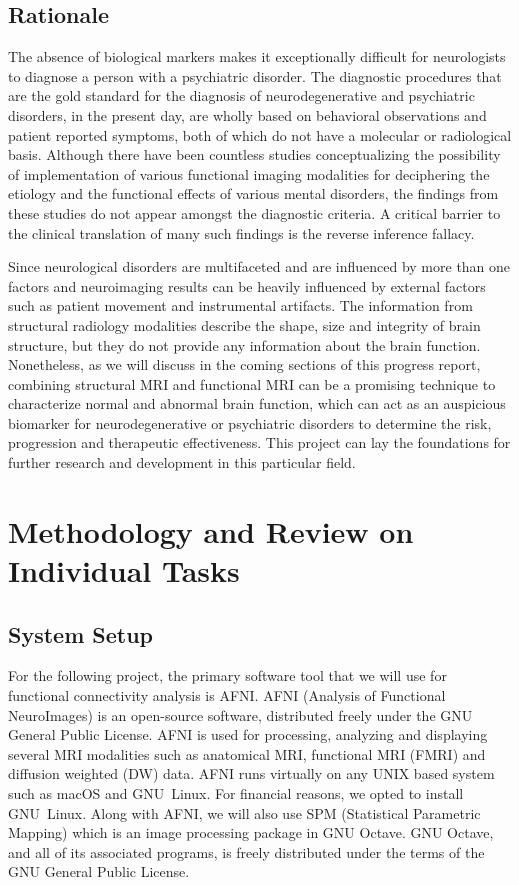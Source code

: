 \documentclass[12pt]{article}
\begin{document}
\subsection{Rationale}

The absence of biological markers makes it exceptionally difficult for
neurologists to diagnose a person with a psychiatric disorder. The
diagnostic procedures that are the gold standard for the diagnosis of
neurodegenerative and psychiatric disorders, in the present day, are
wholly based on behavioral observations and patient reported symptoms,
both of which do not have a molecular or radiological basis. Although
there have been countless studies conceptualizing the possibility of
implementation of various functional imaging modalities for
deciphering the etiology and the functional effects of various mental
disorders, the findings from these studies do not appear amongst the
diagnostic criteria. A critical barrier to the clinical translation of
many such findings is the reverse inference fallacy.

Since neurological disorders are multifaceted and are influenced by
more than one factors and neuroimaging results can be heavily
influenced by external factors such as patient movement and
instrumental artifacts.  The information from structural radiology
modalities describe the shape, size and integrity of brain structure,
but they do not provide any information about the brain function.
Nonetheless, as we will discuss in the coming sections of this
progress report, combining structural MRI and functional MRI can be a
promising technique to characterize normal and abnormal brain
function, which can act as an auspicious biomarker for
neurodegenerative or psychiatric disorders to determine the risk,
progression and therapeutic effectiveness. This project can lay the
foundations for further research and development in this particular
field.

\newpage
\section{Methodology and Review on Individual Tasks}

\subsection{System Setup}%
\label{sub:system_setup}

For the following project, the primary software tool that we will use
for functional connectivity analysis is AFNI. AFNI (Analysis of
Functional NeuroImages) is an open-source software, distributed
freely under the GNU General Public License.  AFNI is used for
processing, analyzing and displaying several MRI modalities such as
anatomical MRI, functional MRI (FMRI) and diffusion weighted (DW)
data. AFNI runs virtually on any UNIX based system such as macOS and
GNU~Linux. For financial reasons, we opted to install GNU~Linux. Along
with AFNI, we will also use SPM (Statistical Parametric Mapping) which
is an image processing package in GNU Octave. GNU Octave, and all of
its associated programs, is freely distributed under the terms of the
GNU General Public License.
\end{document}

